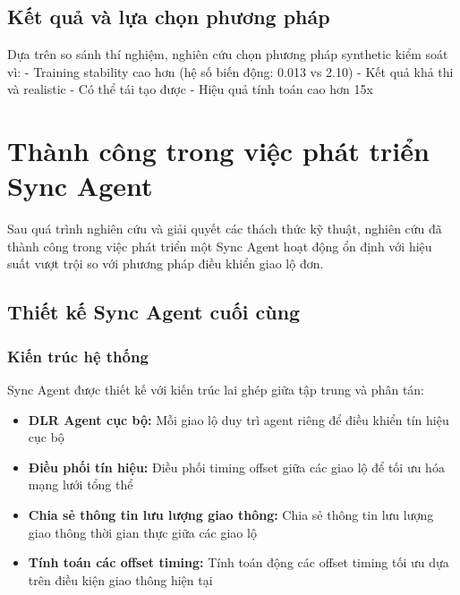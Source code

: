 \subsection{Kết quả và lựa chọn phương pháp}

Dựa trên so sánh thí nghiệm, nghiên cứu chọn phương pháp synthetic kiểm soát vì:
- Training stability cao hơn (hệ số biến động: 0.013 vs 2.10)
- Kết quả khả thi và realistic 
- Có thể tái tạo được
- Hiệu quả tính toán cao hơn 15x

\section{Thành công trong việc phát triển Sync Agent}

Sau quá trình nghiên cứu và giải quyết các thách thức kỹ thuật, nghiên cứu đã
thành công trong việc phát triển một Sync Agent hoạt động ổn định với hiệu suất
vượt trội so với phương pháp điều khiển giao lộ đơn.

\subsection{Thiết kế Sync Agent cuối cùng}

\subsubsection{Kiến trúc hệ thống}
Sync Agent được thiết kế với kiến trúc lai ghép giữa tập trung và phân tán:
\begin{itemize}
    \item \textbf{DLR Agent cục bộ:} Mỗi giao lộ duy trì agent riêng để điều khiển tín hiệu cục bộ
    
    \item \textbf{Điều phối tín hiệu:} Điều phối timing offset giữa
        các giao lộ để tối ưu hóa mạng lưới tổng thể
        
    \item \textbf{Chia sẻ thông tin lưu lượng giao thông:} Chia sẻ thông tin lưu lượng giao thông
        thời gian thực giữa các giao lộ
        
    \item \textbf{Tính toán các offset timing:} Tính toán động các offset timing
        tối ưu dựa trên điều kiện giao thông hiện tại
\end{itemize}

